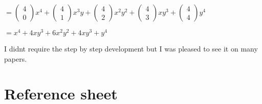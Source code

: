 \documentclass[12pt]{article}
\begin{document}
\begin{enumerate}
$= \left(\begin{array}{c} 4 \\ 0 \end{array}\right)x^{4}+\left(\begin{array}{c} 4 \\ 1 \end{array}\right)x^{3}y+\left(\begin{array}{c} 4 \\ 2 \end{array}\right)x^{2}y^2+\left(\begin{array}{c} 4 \\ 3 \end{array}\right)xy^3+\left(\begin{array}{c} 4 \\ 4\end{array}\right)y^4$

$=x^4 +4xy^3+6x^2y^2+4xy^3+y^4$

I didnt require the step by step development but I was pleased to see it on many papers.


\newpage

\section{Reference sheet}



\end{enumerate}
\end{document}

